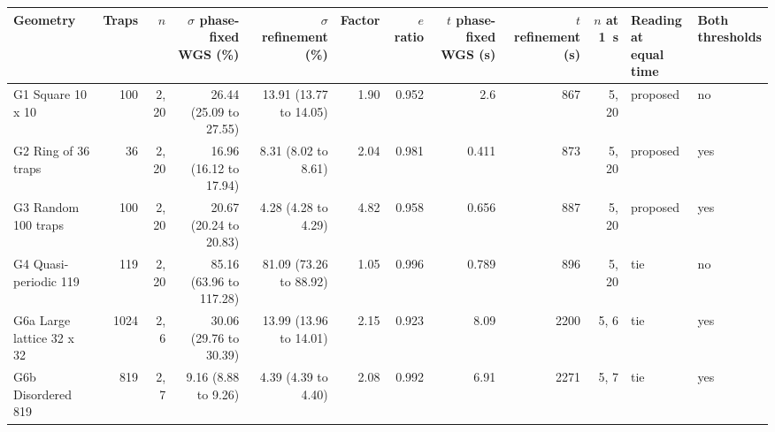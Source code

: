 \begin{tabular}{@{}l r r r r r r r r r l l@{}}
\toprule
Geometry & Traps & $n$ & \shortstack[r]{$\sigma$ phase-fixed\\WGS (\%)} & \shortstack[r]{$\sigma$ refinement\\(\%)} & Factor & $e$ ratio & \shortstack[r]{$t$ phase-fixed\\WGS (s)} & \shortstack[r]{$t$ refinement\\(s)} & $n$ at 1~s & \shortstack[l]{Reading at\\equal time} & \shortstack[l]{Both\\thresholds} \\
\midrule
G1 Square 10 x 10 & 100 & 2, 20 & 26.44 (25.09 to 27.55) & 13.91 (13.77 to 14.05) & 1.90 & 0.952 & 2.6 & 867 & 5, 20 & proposed & no \\
G2 Ring of 36 traps & 36 & 2, 20 & 16.96 (16.12 to 17.94) & 8.31 (8.02 to 8.61) & 2.04 & 0.981 & 0.411 & 873 & 5, 20 & proposed & yes \\
G3 Random 100 traps & 100 & 2, 20 & 20.67 (20.24 to 20.83) & 4.28 (4.28 to 4.29) & 4.82 & 0.958 & 0.656 & 887 & 5, 20 & proposed & yes \\
G4 Quasi-periodic 119 & 119 & 2, 20 & 85.16 (63.96 to 117.28) & 81.09 (73.26 to 88.92) & 1.05 & 0.996 & 0.789 & 896 & 5, 20 & tie & no \\
G6a Large lattice 32 x 32 & 1024 & 2, 6 & 30.06 (29.76 to 30.39) & 13.99 (13.96 to 14.01) & 2.15 & 0.923 & 8.09 & 2200 & 5, 6 & tie & yes \\
G6b Disordered 819 & 819 & 2, 7 & 9.16 (8.88 to 9.26) & 4.39 (4.39 to 4.40) & 2.08 & 0.992 & 6.91 & 2271 & 5, 7 & tie & yes \\
\bottomrule
\end{tabular}
